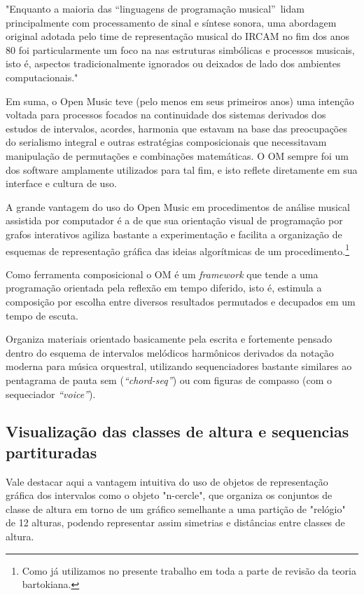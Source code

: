 \documentclass[
	12pt,				%
	openright,			%
	twoside,			%
	a4paper,			%
	english,			%
	french,				%
	spanish,			%
	brazil				%
	]{abntex2}
\begin{document}
\begin{citacao}
"Enquanto a maioria das “linguagens de programação musical”\ lidam principalmente com processamento de sinal e síntese sonora, uma abordagem original adotada pelo time de representação musical do IRCAM no fim dos anos 80 foi
particularmente um foco na nas estruturas simbólicas e processos musicais, isto é, aspectos tradicionalmente
ignorados ou deixados de lado dos ambientes computacionais."\cite[ p.743]{bresson2011openmusic}
\end{citacao}

Em suma, o Open Music teve (pelo menos em seus primeiros anos) uma intenção voltada para processos focados na continuidade dos sistemas derivados dos estudos de intervalos, acordes, harmonia que estavam na base das preocupações do serialismo integral e outras estratégias composicionais que necessitavam manipulação de permutações e combinações matemáticas. O OM sempre foi um dos software amplamente utilizados para tal fim, e isto reflete diretamente em sua interface e cultura de uso.

A grande vantagem do uso do Open Music em procedimentos de análise musical assistida por computador é a de que sua orientação visual de programação por grafos interativos agiliza bastante a experimentação e facilita a organização de esquemas de representação gráfica das ideias algorítmicas de um procedimento.\footnote{Como já utilizamos no presente trabalho em toda a parte de revisão da teoria bartokiana.} 

Como ferramenta composicional o OM é um \textit{framework} que tende a uma programação orientada pela reflexão em tempo diferido, isto é, estimula a composição por escolha entre diversos resultados permutados e decupados em um tempo de escuta.

Organiza materiais orientado basicamente pela escrita e fortemente pensado dentro do esquema de intervalos melódicos
harmônicos derivados da notação moderna para música orquestral, utilizando sequenciadores bastante similares ao pentagrama de pauta sem (\textit{“chord-seq”}) ou com figuras de compasso (com o sequeciador \textit{“voice”}).



\subsection{Visualização das classes de altura e sequencias partituradas}

Vale destacar aqui a vantagem intuitiva do uso de objetos de representação gráfica dos intervalos como o objeto "n-cercle", que organiza os conjuntos de classe de altura em torno de um gráfico semelhante a uma partição de "relógio" de 12 alturas, podendo representar assim simetrias e distâncias entre classes de altura.
\end{document}
